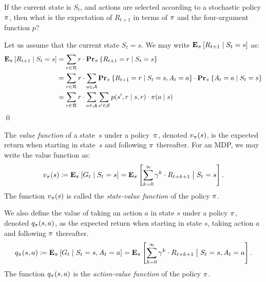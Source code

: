 \begin{exer}
If the current state is $S_t$, and actions are selected according to a stochastic
policy $\pi$, then what is the expectation of $R_{t + 1}$ in terms of 
$\pi$ and the four-argument function $p$?
\end{exer}
\begin{solution}
Let us assume that the current state $S_t = s$. We may write 
$\mathbf{E}_{\pi} \left [ R_{t + 1} \mid S_t = s \right ]$ as:
\begin{align*}
    \mathbf{E}_{\pi} \left [ R_{t + 1} \mid S_t = s \right ] 
        & = \sum_{r \in \mathcal{R}} r \cdot \mathbf{Pr}_{\pi} \left \{ R_{t + 1} = r \mid S_t = s \right \} \\
        & = \sum_{r \in \mathcal{R}} r \cdot \sum_{a \in \mathcal{A}} 
                \mathbf{Pr}_{\pi} \left \{ R_{t + 1} = r\mid S_t = s, A_t = a \right \} 
                    \cdot \mathbf{Pr}_{\pi} \left \{ A_{t} = a \mid S_t = s \right \} \\ 
        & = \sum_{r \in \mathcal{R}} r \cdot \sum_{a \in \mathcal{A}} 
            \sum_{s' \in \mathcal{S}} p(s', r \mid s, r) \cdot \pi (a \mid s) 
\end{align*}
\qed
\end{solution}

The \emph{value function} of a state~$s$ under a policy~$\pi$, denoted 
$v_{\pi}(s)$, is the expected return when starting in state~$s$ and 
following $\pi$ thereafter. For an MDP, we may write the value function as:
\begin{equation}
    v_{\pi}(s) \coloneqq \mathbf{E}_{\pi} \left [ G_t \mid S_t = s \right ] 
        = \mathbf{E}_{\pi} \left [ \sum_{k = 0}^{\infty} \gamma^{k} \cdot R_{t + k + 1} \bigm\vert S_t = s  \right ].
\end{equation}
The function $v_{\pi}(s)$ is called the \emph{state-value function} of the policy $\pi$.

We also define the value of taking an action $a$ in state $s$ under a policy $\pi$, 
denoted $q_{\pi}(s, a)$, as the expected return when starting in state $s$, 
taking action $a$ and following $\pi$ thereafter.
\begin{equation}
    q_{\pi}(s, a) \coloneqq \mathbf{E}_{\pi} \left [ G_t \mid S_t = s, A_t = a \right ] 
        = \mathbf{E}_{\pi} \left [ \sum_{k = 0}^{\infty} \gamma^{k} \cdot R_{t + k + 1} \bigm\vert S_t = s, A_t = a \right ].
\end{equation}
The function $q_{\pi}(s, a)$ is the \emph{action-value function} of the policy $\pi$. 

